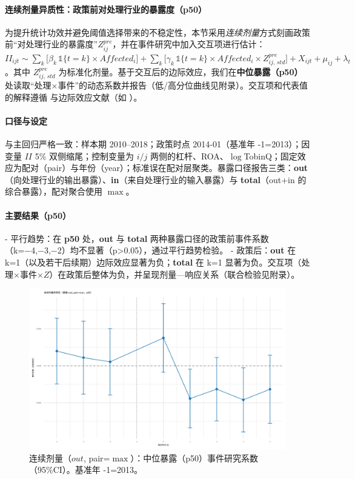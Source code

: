\paragraph{连续剂量异质性：政策前对处理行业的暴露度（p50）}
\label{sec:chap5_network_heterogeneity}

为提升统计功效并避免阈值选择带来的不稳定性，本节采用\emph{连续剂量}方式刻画政策前“对处理行业的暴露度”\(Z^{pre}_{ij}\)，并在事件研究中加入交互项进行估计：
\(II_{ijt} \sim \sum_k\big[\beta_k\,\mathbb{1}\{t=k\}\times Affected_i\big] + \sum_k\big[\gamma_k\,\mathbb{1}\{t=k\}\times Affected_i\times Z^{pre}_{ij,\,std}\big] + X_{ijt}+\mu_{ij}+\lambda_t\)。其中 \(Z^{pre}_{ij,\,std}\) 为标准化剂量。基于交互后的边际效应，我们在\textbf{中位暴露（p50）}处读取“处理×事件”的动态系数并报告（低/高分位曲线见附录）。交互项和代表值的解释遵循 \citet{brambor2006understanding} 与边际效应文献（如 \citet{williams2012margins}）。

\paragraph{口径与设定}
与主回归严格一致：样本期 2010–2018；政策时点 2014-01（基准年 -1=2013）；因变量 \(II\) 5\% 双侧缩尾；控制变量为 \(i/j\) 两侧的杠杆、ROA、\(\log\)TobinQ；固定效应为配对（pair）与年份（year）；标准误在配对层聚类。暴露口径报告三类：\textbf{out}（向处理行业的输出暴露）、\textbf{in}（来自处理行业的输入暴露）与 \textbf{total}（out+in 的综合暴露），配对聚合使用 \(\max\)。

\paragraph{主要结果（p50）}
- 平行趋势：在 \textbf{p50} 处，\textbf{out} 与 \textbf{total} 两种暴露口径的政策前事件系数（k=−4,−3,−2）均不显著（p>0.05），通过平行趋势检验。
- 政策后：\textbf{out} 在 k=1（以及若干后续期）边际效应显著为负；\textbf{total} 在 k=1 显著为负。交互项（处理×事件×\(Z\)）在政策后整体为负，并呈现剂量—响应关系（联合检验见附录）。

\begin{figure}[!htbp]
  \centering
  \includegraphics[width=0.85\linewidth]{figures/PT_exposure_cont_out_max_cont_p50.png}
  \caption{连续剂量（\(out\), pair=\(\max\)）：中位暴露（p50）事件研究系数（95\%CI）。基准年 -1=2013。}
  \label{fig:hetero_expo_cont_out_p50}
\end{figure}

